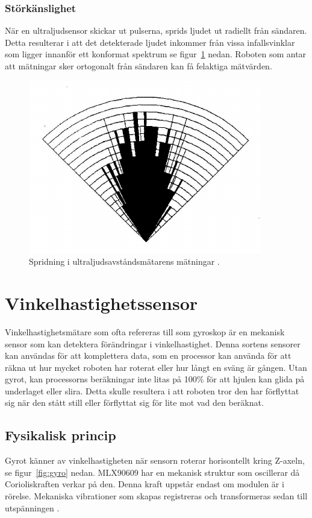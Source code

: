 \documentclass[11pt]{article}
\begin{document}
\begin{flushleft}
\pagebreak 
 
 \subsubsection{Störkänslighet}
När en ultraljudsensor skickar ut pulserna, sprids ljudet ut radiellt från sändaren. Detta resulterar i att det detekterade ljudet inkommer från vissa infallsvinklar som ligger innanför ett konformat spektrum se figur~\ref{fig:ultra} nedan. Roboten som antar att mätningar sker ortogonalt från sändaren kan få felaktiga mätvärden. 

\begin{figure}[H]
\centering
\includegraphics[scale=0.7]{ultra}
\caption{Spridning i ultraljudsavståndsmätarens mätningar \autocite{spridning}. }
\label{fig:ultra}
\end{figure}


 \section{Vinkelhastighetssensor}
 Vinkelhastighetsmätare som ofta refereras till som gyroskop är en mekanisk sensor som kan detektera förändringar i vinkelhastighet. Denna sortens sensorer kan användas för att komplettera data, som en processor kan använda för att räkna ut hur mycket roboten har roterat eller hur långt en sväng är gången. Utan gyrot, kan processorns beräkningar inte litas på 100\% för att hjulen kan glida på underlaget eller slira. Detta skulle resultera i att roboten tror den har förflyttat sig när den stått still eller förflyttat sig för lite mot vad den beräknat.
 
\pagebreak 
 
 \subsection{Fysikalisk princip}
Gyrot känner av vinkelhastigheten när sensorn roterar horisontellt kring Z-axeln, se figur~\ref{fig:gyro} nedan. MLX90609 har en mekanisk struktur som oscillerar då Corioliskraften verkar på den. Denna kraft uppstår endast om modulen är i rörelse. Mekaniska vibrationer som skapas registreras och transformeras sedan till utspänningen \autocite{vanheden-gyro}.
 

\end{flushleft}
\end{document}
